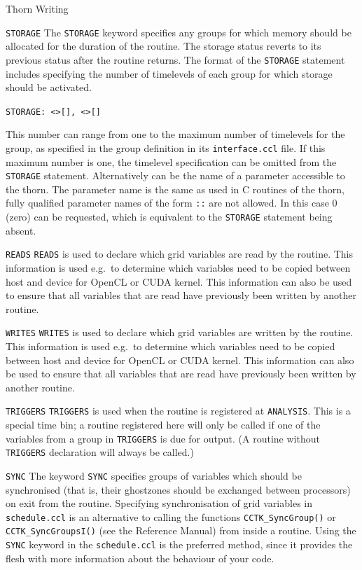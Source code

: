 \begin{cactuspart}{Thorn Writing}
\begin{Lentry}
\item[\texttt{STORAGE}] The \texttt{STORAGE} keyword specifies any groups for
which memory should be allocated for the duration of the routine.  The
storage status reverts to its previous status after the routine
returns. The format of the \texttt{STORAGE} statement includes specifying
the number of timelevels of each group for which storage should be activated.

\texttt{STORAGE: <>[],
<>[]}

 This number can range from one to the maximum number of timelevels for the group, as specified in the group definition in its \texttt{interface.ccl} file. If this maximum number is one, the timelevel specification can be omitted from the
\texttt{STORAGE} statement.
Alternatively  can be the name of a parameter accessible
to the thorn. The parameter name is the same as used in C routines of the
thorn, fully qualified parameter names of the form
\texttt{::} are not allowed. In this case 0 (zero)
 can be requested, which is equivalent to the {\tt STORAGE}
statement being absent.

\item[\texttt{READS}] \texttt{READS} is used to declare which grid
  variables are read by the routine. This information is used e.g.\ to
  determine which variables need to be copied between host and device
  for OpenCL or CUDA kernel. This information can also be used to
  ensure that all variables that are read have previously been written
  by another routine.

\item[\texttt{WRITES}] \texttt{WRITES} is used to declare which grid
  variables are written by the routine. This information is used e.g.\ to
  determine which variables need to be copied between host and device
  for OpenCL or CUDA kernel. This information can also be used to
  ensure that all variables that are read have previously been written
  by another routine.

\item[\texttt{TRIGGERS}] \texttt{TRIGGERS} is used when the routine is
registered at \texttt{ANALYSIS}.  This is a special time bin; a routine
registered here will only be called if one of the variables from a
group in \texttt{TRIGGERS} is due for output.  (A routine without {\tt
TRIGGERS} declaration will always be called.)

\item[\texttt{SYNC}]
The keyword \texttt{SYNC} specifies groups of variables which should be
synchronised (that is, their ghostzones should be exchanged between
processors) on exit from the routine. Specifying synchronisation of
grid variables in \texttt{schedule.ccl} is an alternative to calling the
functions \texttt{CCTK\_SyncGroup()} or \texttt{CCTK\_SyncGroupsI()}
(see the Reference Manual) from inside a routine. Using the \texttt{SYNC}
keyword in the \texttt{schedule.ccl} is the preferred method, since it
provides the flesh with more information about the behaviour of your code.




\end{Lentry}
\end{cactuspart}
